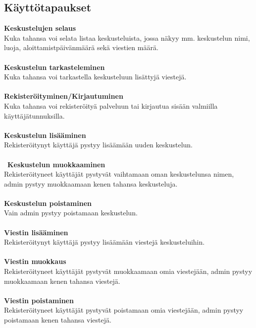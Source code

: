 \documentclass[11pt]{article}
\begin{document}
\subsection{Käyttötapaukset}
\textbf{Keskustelujen selaus}\\
Kuka tahansa voi selata listaa keskusteluista, jossa näkyy mm. keskustelun nimi, luoja, aloittamistpäivänmäärä sekä viestien määrä.\\\\
\textbf{Keskustelun tarkasteleminen}\\
Kuka tahansa voi tarkastella keskusteluun lisättyjä viestejä.\\\\
\textbf{Rekisteröityminen/Kirjautuminen}\\
Kuka tahansa voi rekisteröityä palveluun tai kirjautua sisään valmiilla käyttäjätunnuksilla.\\\\
\textbf{Keskustelun lisääminen}\\
Rekisteröitynyt käyttäjä pystyy lisäämään uuden keskustelun.\\\\\
\textbf{Keskustelun muokkaaminen}\\
Rekisteröityneet käyttäjät pystyvät vaihtamaan oman keskustelunsa nimen, admin pystyy muokkaamaan kenen tahansa keskusteluja.\\\\
\textbf{Keskustelun poistaminen}\\
Vain admin pystyy poistamaan keskustelun.\\\\
\textbf{Viestin lisääminen}\\
Rekisteröitynyt käyttäjä pystyy lisäämään viestejä keskusteluihin.\\\\
\textbf{Viestin muokkaus}\\
Rekisteröityneet käyttäjät pystyvät muokkaamaan omia viestejään, admin pystyy muokkaamaan kenen tahansa viestejä.\\\\
\textbf{Viestin poistaminen}\\
Rekisteröityneet käyttäjät pystyvät poistamaan omia viestejään, admin pystyy poistamaan kenen tahansa viestejä.\\\\
\end{document}
